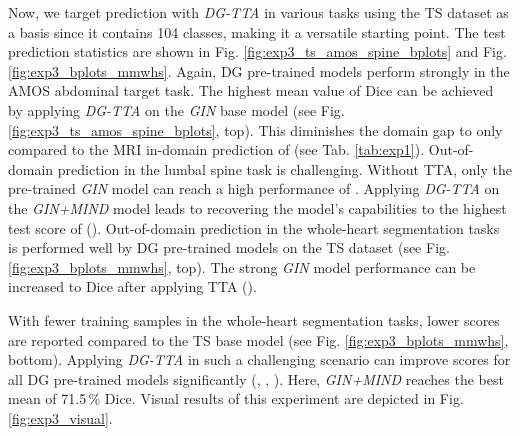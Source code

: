         Now, we target prediction with \emph{DG-TTA} in various tasks using the TS dataset as a basis since it contains 104 classes, making it a versatile starting point. The test prediction statistics are shown in Fig. \ref{fig:exp3_ts_amos_spine_bplots} and Fig. \ref{fig:exp3_bplots_mmwhs}. Again, DG pre-trained models perform strongly in the AMOS abdominal target task. The highest mean value of  Dice can be achieved by applying \emph{DG-TTA} on the \emph{GIN} base model (see Fig. \ref{fig:exp3_ts_amos_spine_bplots}, top). This diminishes the domain gap to only  compared to the MRI in-domain prediction of  (see Tab. \ref{tab:exp1}).
        Out-of-domain prediction in the lumbal spine task  is challenging. Without TTA, only the pre-trained \emph{GIN} model can reach a high performance of . Applying \emph{DG-TTA} on the \emph{GIN+MIND} model leads to recovering the model's capabilities to the highest test score of  ().
        Out-of-domain prediction in the whole-heart segmentation tasks is performed well by DG pre-trained models on the TS dataset (see Fig. \ref{fig:exp3_bplots_mmwhs}, top). The strong \emph{GIN} model performance can be increased to  Dice after applying TTA ().

        With fewer training samples in the  whole-heart segmentation tasks, lower scores are reported compared to the TS base model (see Fig. \ref{fig:exp3_bplots_mmwhs}, bottom). Applying \emph{DG-TTA} in such a challenging scenario can improve scores for all DG pre-trained models significantly (, , ). Here, \emph{GIN+MIND} reaches the best mean of 71.5\,\% Dice.
        Visual results of this experiment are depicted in Fig. \ref{fig:exp3_visual}.



